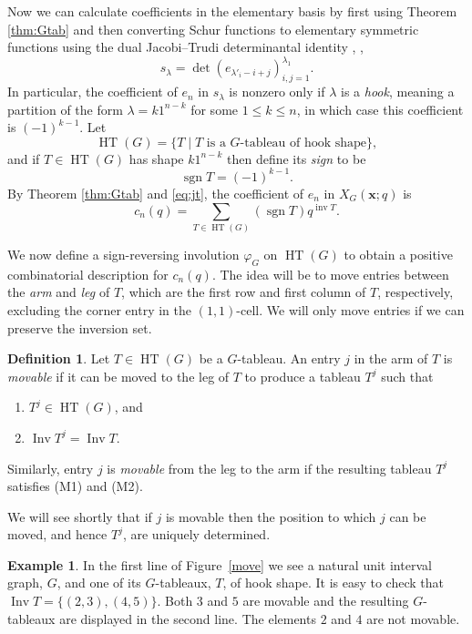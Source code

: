 \documentclass[10pt,a4paper]{amsart}
\theoremstyle{definition}
\newtheorem{definition}[theorem]{Definition}
\newtheorem{example}[theorem]{Example}
\theoremstyle{remark}
\numberwithin{equation}{section}
\newcommand{\la}{\lambda}
\DeclareMathOperator{\Inv}{Inv}
\DeclareMathOperator{\inv}{inv}
\DeclareMathOperator{\HT}{HT}
\DeclareMathOperator{\sgn}{sgn}
\begin{document}
Now we can calculate coefficients in the elementary basis by first using Theorem \ref{thm:Gtab} and then converting Schur functions to elementary symmetric functions using the dual Jacobi--Trudi determinantal identity \cite[Theorem 4.5.1]{symgroup}, \cite[Corollary 7.16.2]{enum2},
\begin{equation}\label{eq:jt}
s_\lambda=\det(e_{\lambda'_i-i+j})_{i,j=1}^{\la_1}.
\end{equation}
In particular, the coefficient of $e_n$ in $s_\lambda$ is nonzero only if $\lambda$ is a \emph{hook}, meaning a partition of the form $\lambda=k1^{n-k}$ for some $1\leq k\leq n$, in which case this coefficient is $(-1)^{k-1}$. Let 
$$
\HT(G)=\{ T \mid \text{$T$ is a $G$-tableau of hook shape}\},
$$
and if $T\in\HT(G)$ has shape $k1^{n-k}$
then define its {\em sign} to be
$$
\sgn T=(-1)^{k-1}. 
$$
By Theorem \ref{thm:Gtab} and \eqref{eq:jt}, the coefficient of $e_n$ in $X_G(\bm x;q)$ is
\begin{equation}\label{eq:cnq}
c_n(q)=\sum_{T\in\HT(G)}(\sgn T) q^{\inv T}.
\end{equation}


We now define a sign-reversing involution $\varphi_G$ on $\HT(G)$ to obtain a positive combinatorial description for $c_n(q)$. The idea will be to move entries between the \emph{arm} and \emph{leg} of $T$, which are the first row and first column of $T$, respectively, excluding the corner entry in the $(1,1)$-cell. We will only move entries if we can preserve the inversion set.

\begin{definition}
Let $T\in\HT(G)$ be a $G$-tableau. An entry $j$ in the arm of $T$ is \emph{movable} if it can be moved to the leg of $T$ to produce a tableau 
$T^j$ such that
\begin{enumerate}
    \item[(M1)] $T^j\in\HT(G)$, and
    \item[(M2)] $\Inv T^j=\Inv T$.
\end{enumerate}
Similarly,  entry $j$ is {\em movable} from the leg to the arm if the resulting tableau $T^j$ satisfies (M1) and (M2).

\end{definition}

We will see shortly that if $j$ is movable then the position to which $j$ can be moved, and hence $T^j$, are uniquely determined.

\begin{example}

In the first line of Figure~\ref{move} we see a natural unit interval graph, $G$, and one of its $G$-tableaux, $T$, of hook shape.  It is easy to check that $\Inv T =\{ (2,3), (4,5)\}$.  Both $3$ and $5$ are movable and the resulting $G$-tableaux are displayed in the second line.  The elements $2$ and $4$ are not 
movable.

\end{example}
\end{document}
